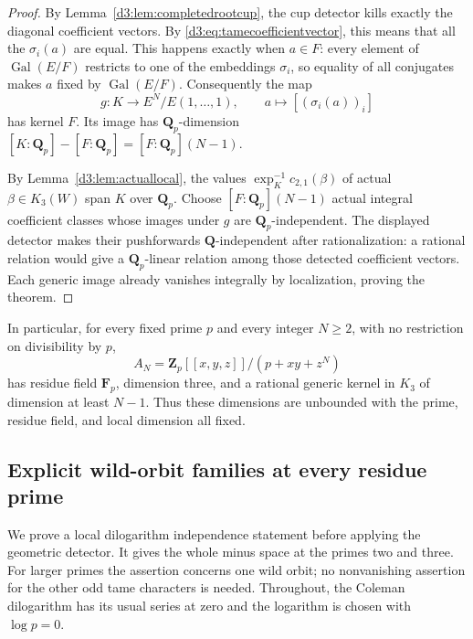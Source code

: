 \documentclass[11pt,a4paper]{amsart}
\numberwithin{equation}{section}
\theoremstyle{definition}
\theoremstyle{remark}
\newcommand{\Q}{\mathbf Q}
\newcommand{\Z}{\mathbf Z}
\newcommand{\F}{\mathbf F}
\newcommand{\Gal}{\operatorname{Gal}}
\begin{document}
\begin{proof}
By Lemma~\ref{d3:lem:completedrootcup}, the cup detector kills exactly the diagonal coefficient vectors. By \eqref{d3:eq:tamecoefficientvector}, this means that all the $\sigma_i(a)$ are equal. This happens exactly when $a\in F$: every element of $\Gal(E/F)$ restricts to one of the embeddings $\sigma_i$, so equality of all conjugates makes $a$ fixed by $\Gal(E/F)$. Consequently the map
\[
g:K\longrightarrow E^N/E(1,\ldots,1),
\qquad a\longmapsto[(\sigma_i(a))_i]
\]
has kernel $F$. Its image has $\Q_p$-dimension
$[K:\Q_p]-[F:\Q_p]=[F:\Q_p](N-1)$.

By Lemma~\ref{d3:lem:actuallocal}, the values
$\exp_K^{-1}c_{2,1}(\beta)$ of actual $\beta\in K_3(W)$ span $K$ over $\Q_p$. Choose $[F:\Q_p](N-1)$ actual integral coefficient classes whose images under $g$ are $\Q_p$-independent. The displayed detector makes their pushforwards $\Q$-independent after rationalization: a rational relation would give a $\Q_p$-linear relation among those detected coefficient vectors. Each generic image already vanishes integrally by localization, proving the theorem.
\end{proof}

In particular, for every fixed prime $p$ and every integer $N\geq2$, with no restriction on divisibility by $p$,
\[
A_N=\Z_p[[x,y,z]]/(p+xy+z^N)
\]
has residue field $\F_p$, dimension three, and a rational generic kernel in $K_3$ of dimension at least $N-1$. Thus these dimensions are unbounded with the prime, residue field, and local dimension all fixed.


\subsection{Explicit wild-orbit families at every residue prime}
\label{d3:sec:explicitwildorbit}

We prove a local dilogarithm independence statement before applying the
geometric detector. It gives the whole minus space at the primes two
and three. For larger primes the assertion concerns one wild orbit;
no nonvanishing assertion for the other odd tame characters is needed.
Throughout, the Coleman dilogarithm has its usual series at zero and
the logarithm is chosen with $\log p=0$.
\end{document}

